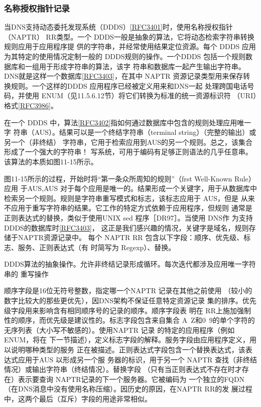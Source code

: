 \subsubsection{名称授权指针记录}

当DNS支持动态委托发现系统（DDDS）\href{https://www.rfc-editor.org/rfc/rfc3401}{[RFC3401]}时，使用名称授权指针（NAPTR）
RR类型。一个 DDDS一般是抽象的算法，它将动态检索字符串转换规则应用于应用程序提
供的字符串，并经常使用结果定位资源。每个 DDDS 应用为其特定的使用情况定制一般的
DDDS规则的操作。一个DDDS 包括一个规则数据库和一组用于形成字符串的算法，该字
符串和数据库一起产生输出字符串。DNS就是这样一个数据库\href{https://www.rfc-editor.org/rfc/rfc3403}{[RFC3403]}，在其中
NAPTR
资源记录类型用来保存转换规则。一个这样的DDDS 应用程序已经被定义用来和DNS一起
处理跨国电话号码，并使用 ENUM（见11.5.6.12节）将它们转换为标准的统一资源标识符
（URI）格式\href{https://www.rfc-editor.org/rfc/rfc3986}{[RFC3986]}。

在一个 DDDS
中，算法\href{https://www.rfc-editor.org/rfc/rfc3402}{[RFC3402]}指如何通过数据库中包含的规则处理应用唯一字
符串（AUS）。结果可以是一个终结字符串（terminal string）（完整的输出）或另一个（非终结）
字符串，它用于检索应用到AUS的另一个规则。总之，该集合形成了一个强大的字符串！
写系统，可用于编码有足够正则语法的几乎任意串。该算法的本质如图11-15所示。

图11-15所示的过程，开始时将“第一条众所周知的规则”（frst Well-Known Rule）应用
于AUS,AUS 对于每个应用是唯一的。结果形成一个关键字，用于从数据库中
检索另一个规则。规则是字符串重写模式和标志，该标志应用于 AUS，但是
从来不应用于重写字符串的结果。它工作的特定方式依赖于应用程序，但规则
通常是正则表达式的替换，类似于使用UNIX sed 程序［DR97］。当使用 DNS作
为支持DDDS的数据库时\href{https://www.rfc-editor.org/rfc/rfc3403}{[RFC3403]}，
这正是我们感兴趣的情况，关键字是域名，规则存储于NAPTR资源记录中。
每个 NAPTR RR 包含以下字段：顺序、优先级、标志、服务、正则表达式（有
时简写为 Regexp）、替换。

DDDS算法的抽象操作。允许非终结记录形成循环。每次迭代都涉及应用唯一字符串的
重写操作

顺序字段是16位无符号整数，指定哪一个NAPTR 记录在其他之前使用
（较小的数字比较大的那些更优先），因DNS架构不保证任意特定资源记录
集的排序。优先级字段用来影响含有相同顺序号的记录的顺序。顺序字段表
明在 RR上施加强制性的顺序，而优先级是建议性的。标志字段包含来自集合
A~Z和0~9的单个字符的无序列表（大小写不敏感的）。使用NAPTR 记录
的特定的应用程序（例如 ENUM，将在
下一节描述），定义标志字段的解释。服务字段由应用程序定义，用以说明哪种类型的服务
正在被描述。正则表达式字段包含一个替换表达式，该表达式应用于AUS 以形成另一个服
务器的标识，用于另一个 NAPTR 查找（非终结情况）或输出字符串（终结情况）。替换字段
（只有当正则表达式不存在时才存在）表示要查询 NAPTR记录的下一个服务器。它被编码为
一个独立的FQDN（在DNS消息中没有使用名称压缩）。因历史的原因，在NAPTR RR的发
展过程中，这两个最后（互斥）字段的用途非常相似。

